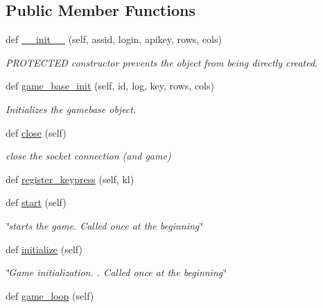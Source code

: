 \subsection*{Public Member Functions}
\begin{DoxyCompactItemize}
\item 
def \hyperlink{classbridges_1_1gamebase_1_1_game_base_a590e8712065678b03ccd8a6012b7220f}{\+\_\+\+\_\+init\+\_\+\+\_\+} (self, assid, login, apikey, rows, cols)
\begin{DoxyCompactList}\small\item\em P\+R\+O\+T\+E\+C\+T\+ED constructor prevents the object from being directly created. \end{DoxyCompactList}\item 
def \hyperlink{classbridges_1_1gamebase_1_1_game_base_a397e82bd17f18bc60286bc7479e959ac}{game\+\_\+base\+\_\+init} (self, id, log, key, rows, cols)
\begin{DoxyCompactList}\small\item\em Initializes the gamebase object. \end{DoxyCompactList}\item 
def \hyperlink{classbridges_1_1gamebase_1_1_game_base_aa30b096b3b2834d36a05acd982625517}{close} (self)
\begin{DoxyCompactList}\small\item\em close the socket connection (and game) \end{DoxyCompactList}\item 
def \hyperlink{classbridges_1_1gamebase_1_1_game_base_ac60243e192a502fb7be51f86eb5b76b6}{register\+\_\+keypress} (self, kl)
\item 
def \hyperlink{classbridges_1_1gamebase_1_1_game_base_a05a30fccf88c2baba1137b5a06ba2ed7}{start} (self)
\begin{DoxyCompactList}\small\item\em \char`\"{}starts the game. Called once at the beginning\char`\"{} \end{DoxyCompactList}\item 
def \hyperlink{classbridges_1_1gamebase_1_1_game_base_a336629d190f1601f1211ca57e4d5427d}{initialize} (self)
\begin{DoxyCompactList}\small\item\em \char`\"{}\+Game initialization. . Called once at the beginning\char`\"{} \end{DoxyCompactList}\item 
def \hyperlink{classbridges_1_1gamebase_1_1_game_base_af650eeb756558d2cbcae43c74de5cce7}{game\+\_\+loop} (self)

\end{DoxyCompactItemize}
